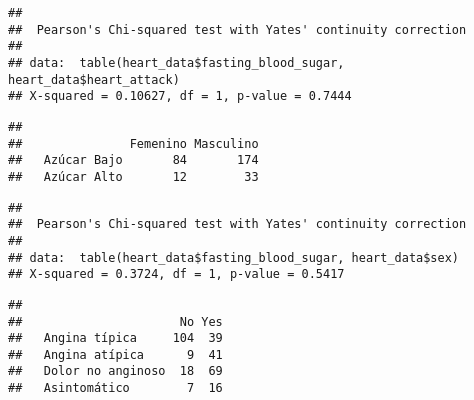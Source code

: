 \documentclass[
]{article}
\newenvironment{Shaded}{\begin{snugshade}}{\end{snugshade}}
\newcommand{\CommentTok}[1]{\textcolor[rgb]{0.56,0.35,0.01}{\textit{#1}}}
\newcommand{\FunctionTok}[1]{\textcolor[rgb]{0.00,0.00,0.00}{#1}}
\newcommand{\NormalTok}[1]{#1}
\newcommand{\SpecialCharTok}[1]{\textcolor[rgb]{0.00,0.00,0.00}{#1}}
\begin{document}
\begin{verbatim}
## 
##  Pearson's Chi-squared test with Yates' continuity correction
## 
## data:  table(heart_data$fasting_blood_sugar, heart_data$heart_attack)
## X-squared = 0.10627, df = 1, p-value = 0.7444
\end{verbatim}

\begin{Shaded}
\end{Shaded}

\begin{verbatim}
##              
##               Femenino Masculino
##   Azúcar Bajo       84       174
##   Azúcar Alto       12        33
\end{verbatim}

\begin{Shaded}
\end{Shaded}

\begin{verbatim}
## 
##  Pearson's Chi-squared test with Yates' continuity correction
## 
## data:  table(heart_data$fasting_blood_sugar, heart_data$sex)
## X-squared = 0.3724, df = 1, p-value = 0.5417
\end{verbatim}

\begin{Shaded}
\end{Shaded}

\begin{verbatim}
##                    
##                      No Yes
##   Angina típica     104  39
##   Angina atípica      9  41
##   Dolor no anginoso  18  69
##   Asintomático        7  16
\end{verbatim}
\end{document}
